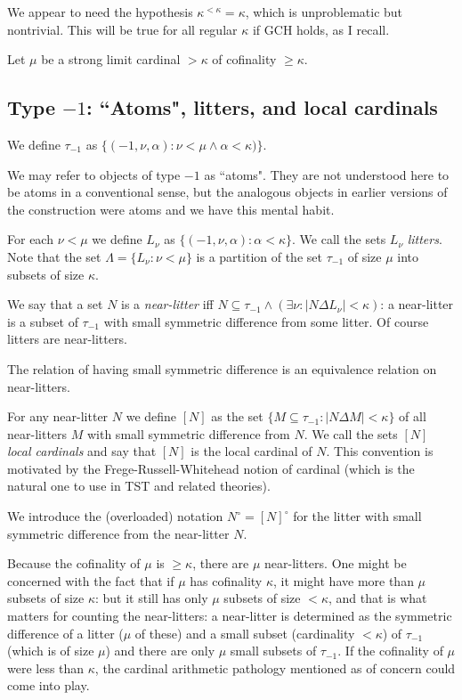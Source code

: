 \documentclass[112pt]{article}
\begin{document}
We appear to need the hypothesis $\kappa^{<\kappa} = \kappa$, which is unproblematic but nontrivial. This will be true for all regular $\kappa$ if GCH holds, as I recall.

Let $\mu$ be a strong limit cardinal $>\kappa$ of cofinality $\geq \kappa$.  



\subsection{Type $-1$:  ``Atoms", litters, and local cardinals}

We define $\tau_{-1}$ as $\{(-1,\nu,\alpha):\nu <\mu \wedge \alpha<\kappa)\}$.

We may refer to objects of type $-1$ as ``atoms".  They are not understood here to be atoms in a conventional sense, but the analogous objects in earlier versions of the construction were atoms and we have this mental habit.

For each $\nu<\mu$ we define $L_\nu$ as $\{(-1,\nu,\alpha):\alpha<\kappa\}$.  We call the sets $L_\nu$ {\em litters\/}.
Note that the set $\Lambda = \{L_\nu:\nu < \mu\}$ is a partition of the set $\tau_{-1}$ of size $\mu$ into subsets of size $\kappa$.

We say that a set $N$ is a {\em near-litter\/} iff $N \subseteq \tau_{-1} \wedge (\exists \nu:|N \Delta L_\nu|<\kappa)$:  a near-litter is a subset of $\tau_{-1}$ with small symmetric difference from some litter.  Of course litters are near-litters.

The relation of having small symmetric difference is an equivalence relation on near-litters.

For any near-litter $N$ we define $[N]$ as the set $\{M\subseteq \tau_{-1}:|N \Delta M| <\kappa\}$  of all near-litters $M$ with small symmetric difference from $N$.  We call the sets $[N]$ {\em local cardinals\/} and say that $[N]$ is the local cardinal of $N$.  This convention is motivated by the Frege-Russell-Whitehead notion of cardinal (which is the natural one to use in TST and related theories).

We introduce the (overloaded) notation $N^\circ = [N]^\circ$ for the litter with small symmetric difference from the near-litter $N$.

Because the cofinality of $\mu$ is $\geq \kappa$, there are $\mu$ near-litters.   One might be concerned with the fact that if $\mu$ has cofinality $\kappa$, it might have more than $\mu$ subsets of size $\kappa$:  but it still has only $\mu$ subsets of size $<\kappa$, and that is what matters for counting the near-litters:  a near-litter is determined as the symmetric difference of a litter ($\mu$ of these) and a small subset (cardinality $<\kappa$) of $\tau_{-1}$ (which is of size $\mu$) and there are only $\mu$ small subsets of $\tau_{-1}$.  If the cofinality of $\mu$ were less than $\kappa$, the cardinal arithmetic pathology mentioned as of concern could come into play.
\end{document}
